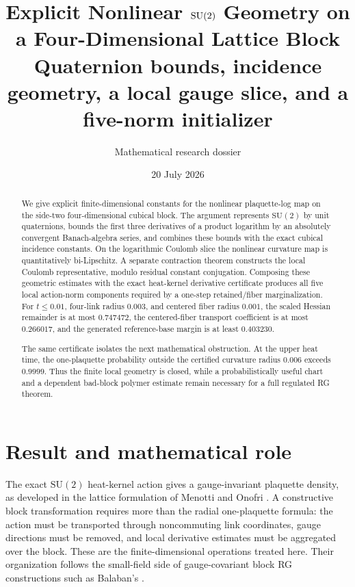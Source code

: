 \documentclass[11pt]{article}
\title{Explicit Nonlinear $\SU$ Geometry on a Four-Dimensional Lattice Block\\
\large Quaternion bounds, incidence geometry, a local gauge slice, and a five-norm initializer}
\author{Mathematical research dossier}
\date{20 July 2026}
\theoremstyle{definition}
\newcommand{\SU}{\mathrm{SU}(2)}
\begin{document}
\maketitle

\begin{abstract}
We give explicit finite-dimensional constants for the nonlinear plaquette-log
map on the side-two four-dimensional cubical block.  The argument represents
$\SU$ by unit quaternions, bounds the first three derivatives of a product
logarithm by an absolutely convergent Banach-algebra series, and combines
these bounds with the exact cubical incidence constants.  On the logarithmic
Coulomb slice the nonlinear curvature map is quantitatively bi-Lipschitz.  A
separate contraction theorem constructs the local Coulomb representative,
modulo residual constant conjugation.  Composing these geometric estimates
with the exact heat-kernel derivative certificate produces all five local
action-norm components required by a one-step retained/fiber marginalization.
For $t\leq 0.01$, four-link radius $0.003$, and centered fiber radius $0.001$,
the scaled Hessian remainder is at most $0.747472$, the centered-fiber
transport coefficient is at most $0.266017$, and the generated reference-base
margin is at least $0.403230$.

The same certificate isolates the next mathematical obstruction.  At the
upper heat time, the one-plaquette probability outside the certified
curvature radius $0.006$ exceeds $0.9999$.  Thus the finite local geometry is
closed, while a probabilistically useful chart and a dependent bad-block
polymer estimate remain necessary for a full regulated RG theorem.
\end{abstract}

\tableofcontents

\section{Result and mathematical role}

The exact $\SU$ heat-kernel action gives a gauge-invariant plaquette density,
as developed in the lattice formulation of Menotti and Onofri
\cite{MenottiOnofri1981}.  A constructive block transformation requires more
than the radial one-plaquette formula: the action must be transported through
noncommuting link coordinates, gauge directions must be removed, and local
derivative estimates must be aggregated over the block.  These are the
finite-dimensional operations treated here.  Their organization follows the
small-field side of gauge-covariant block RG constructions such as
Balaban's \cite{Balaban1984,Balaban1987}.
\end{document}
